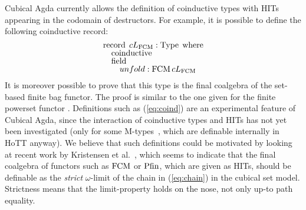 \documentclass[a4paper,USenglish,cleveref]{lipics-v2021}
\begin{document}
Cubical Agda currently allows the definition of coinductive types with HITs appearing in the codomain of destructors. For example, it is possible to define the following coinductive record:
\begin{equation}\label{eq:coind}
\def\arraystretch{0.8}
\begin{array}{l}
\Op{record} \; \cLim{\FCM} :  \Type \;\Op{where} \\
\quad  \Op{coinductive} \\
 \quad \Op{field} \\
 \quad \quad  \unfold : \FCM \cLim{\FCM}
\end{array}
\end{equation}
It is moreover possible to prove that this type is the final coalgebra of the set-based finite bag functor. The proof is similar to the one given for the finite powerset functor \cite[Theorem 2]{Veltri2021}. Definitions such as (\ref{eq:coind}) are an experimental feature of Cubical Agda, since the interaction of coinductive types and HITs has not yet been investigated (only for some M-types~\cite{Vezzosi2019}, which are definable internally in HoTT anyway). We believe that such definitions could be motivated by looking at recent work by Kristensen et al.~\cite{Kristensen2022}, which seems to indicate that the final coalgebra of functors such as $\FCM$ or $\Op{Pfin}$, which are given as HITs, should be definable as the \emph{strict} $\omega$-limit of the chain in (\ref{eq:chain}) in the cubical set model. Strictness means that the limit-property holds on the nose, not only up-to path equality.



\end{document}

